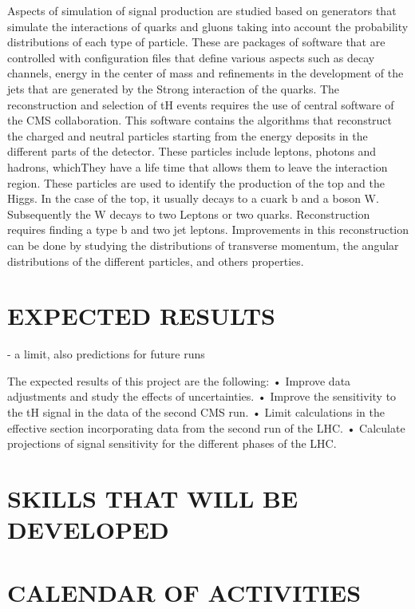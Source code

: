 \documentclass[final,3p]{CSP}
\begin{document}
Aspects of simulation of signal production are studied based on generators that simulate the interactions of quarks and gluons taking 
into account the probability distributions of each type of particle. These are packages of software that are controlled with 
configuration files that define various aspects such as decay channels, energy in the center of mass and refinements in the development 
of the jets that are generated by the Strong interaction of the quarks. The reconstruction and selection of tH events requires the use 
of central software of the CMS collaboration. This software contains the algorithms that reconstruct the charged and neutral particles 
starting from the energy deposits in the different parts of the detector. These particles include leptons, photons and hadrons, 
whichThey have a life time that allows them to leave the interaction region. These particles are used to identify the production of the 
top and the Higgs. In the case of the top, it usually decays to a cuark b and a boson W. Subsequently the W decays to two Leptons or two 
quarks. Reconstruction requires finding a type b and two jet leptons. Improvements in this reconstruction can be done by studying the 
distributions of transverse momentum, the angular distributions of the different particles, and others properties.

\section{EXPECTED RESULTS}
- a limit, also predictions for future runs

The expected results of this project are the following:
• Improve data adjustments and study the effects of uncertainties.
• Improve the sensitivity to the tH signal in the data of the second CMS run.
• Limit calculations in the effective section incorporating data from the second
run of the LHC.
• Calculate projections of signal sensitivity for the different phases of the LHC.


\cleardoublepage



\appendix
\section{SKILLS THAT WILL BE DEVELOPED}

\section{CALENDAR OF ACTIVITIES}
\end{document}
